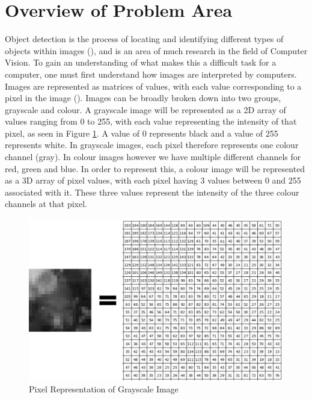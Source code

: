 \documentclass[12pt]{report}
\begin{document}
\section{Overview of Problem Area}
\begin{flushleft}
Object detection is the process of locating and identifying different types of objects within images (\cite{verschae2015object}), and is an area of much research in the field of Computer Vision. To gain an understanding of what makes this a difficult task for a computer, one must first understand how images are interpreted by computers. Images are represented as matrices of values, with each value corresponding to a pixel in the image (\cite{learned2011introduction}). Images can be broadly broken down into two groups, grayscale and colour. A grayscale image will be represented as a 2D array of values ranging from 0 to 255, with each value representing the intensity of that pixel, as seen in Figure \ref{fig:pixels}. A value of 0 represents black and a value of 255 represents white. In grayscale images, each pixel therefore represents one colour channel (gray). In colour images however we have multiple different channels for red, green and blue. In order to represent this, a colour image will be represented as a 3D array of pixel values, with each pixel having 3 values between 0 and 255 associated with it. These three values represent the intensity of the three colour channels at that pixel.
\end{flushleft}

\vspace{0.5cm}
\begin{figure}[ht!]
	\centering
	\includegraphics[width=12cm]{pixels}
	\caption{Pixel Representation of Grayscale Image}
	\label{fig:pixels}
\end{figure}
\end{document}
